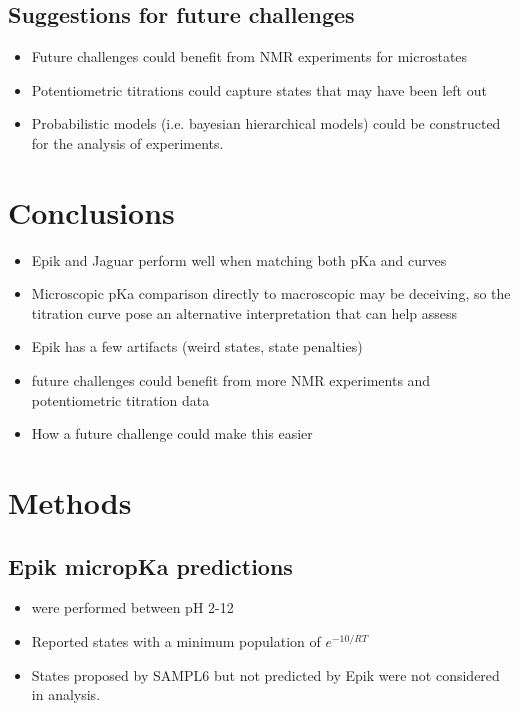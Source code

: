 \documentclass[9pt,lineno,final]{elife}
\begin{document}
\subsection{Suggestions for future challenges}
\begin{itemize}
	\item Future challenges could benefit from NMR experiments for microstates
	\item Potentiometric titrations could capture states that may have been left out
	\item Probabilistic models (i.e. bayesian hierarchical models) could be constructed for the analysis of experiments. 
\end{itemize}

\section{Conclusions}

\begin{itemize}
	\item Epik and Jaguar perform well when matching both pKa and curves
	\item Microscopic pKa comparison directly to macroscopic may be deceiving, so the titration curve pose an alternative interpretation that can help assess
	\item Epik has a few artifacts (weird states, state penalties)
	\item future challenges could benefit from more NMR experiments and potentiometric titration data
	\item How a future challenge could make this easier
\end{itemize}


\section{Methods}

\subsection{Epik micropKa predictions}
\begin{itemize}
	\item were performed between pH 2-12
	\item Reported states with a minimum population of $e^{-10/RT}$
	\item States proposed by SAMPL6 but not predicted by Epik were not considered in analysis.
	      
\end{itemize}
\end{document}
